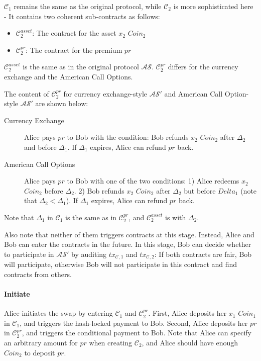 $\mathcal{C}_1$ remains the same as the original protocol, while $\mathcal{C}_2$ is more sophisticated here - It contains two coherent sub-contracts as follows:

\begin{itemize}
    \item $\mathcal{C}^{asset}_2$: The contract for the asset $x_2$ $Coin_2$
    \item $\mathcal{C}^{pr}_2$: The contract for the premium $pr$
\end{itemize}

$\mathcal{C}^{asset}_2$ is the same as in the original protocol $\mathcal{AS}$.
$\mathcal{C}^{pr}_2$ differs for the currency exchange and the American Call Options.

The content of $\mathcal{C}^{pr}_2$ for currency exchange-style $\mathcal{AS}'$ and American Call Option-style $\mathcal{AS}'$ are shown below:

\begin{description}
    \item[Currency Exchange] Alice pays $pr$ to Bob with the condition:
    Bob refunds $x_2$ $Coin_2$ after $\Delta_2$ and before $\Delta_1$.
    If $\Delta_1$ expires, Alice can refund $pr$ back.
    \item[American Call Options] Alice pays $pr$ to Bob with one of the two conditions:
    1) Alice redeems $x_2$ $Coin_2$ before $\Delta_2$.
    2) Bob refunds $x_2$ $Coin_2$ after $\Delta_2$ but before $Delta_1$ (note that $\Delta_2 < \Delta_1$).
    If $\Delta_1$ expires, Alice can refund $pr$ back.
\end{description}

Note that $\Delta_1$ in $\mathcal{C}_1$ is the same as in $\mathcal{C}^{pr}_2$, and $\mathcal{C}^{asset}_2$ is with $\Delta_2$.

Also note that neither of them triggers contracts at this stage.
Instead, Alice and Bob can enter the contracts in the future.
In this stage, Bob can decide whether to participate in $\mathcal{AS}'$ by auditing $tx_{\mathcal{C}, 1}$ and $tx_{\mathcal{C}, 2}$: If both contracts are fair, Bob will participate, otherwise Bob will not participate in this contract and find contracts from others.

\paragraph{Initiate}
Alice initiates the swap by entering $\mathcal{C}_1$ and $\mathcal{C}^{pr}_2$.
First, Alice deposits her $x_1$ $Coin_1$ in $\mathcal{C}_1$, and triggers the hash-locked payment to Bob.
Second, Alice deposits her $pr$ in $\mathcal{C}^{pr}_2$, and triggers the conditional payment to Bob.
Note that Alice can specify an arbitrary amount for $pr$ when creating $\mathcal{C}_2$, and Alice should have enough $Coin_2$ to deposit $pr$.

